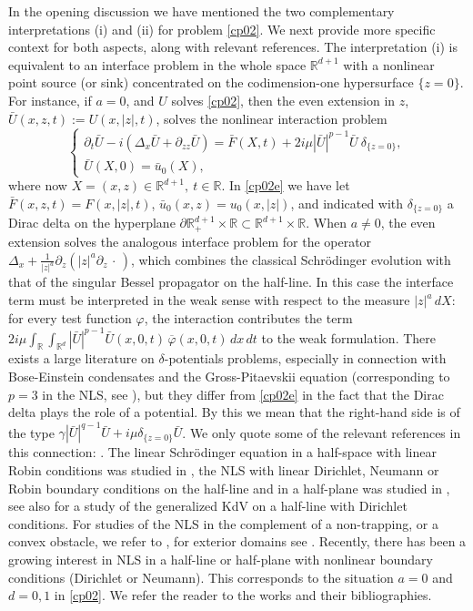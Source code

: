 \documentclass[11pt,letter]{amsart}
\def \RN {\mathbb{R}_+^{d+1}}
\def \R {\mathbb{R}}
\def \vf{\varphi}
\newcommand{\Rd}{\mathbb R^d}
\newcommand{\p}{\partial}
\numberwithin{equation}{section}
\numberwithin{equation}{section}
\begin{document}
In the opening discussion we have mentioned the two complementary interpretations  (i) and (ii) for problem \eqref{cp02}. We next provide more specific context for both aspects, along with relevant references. The interpretation (i) is  equivalent to an interface problem in the whole space $\R^{d+1}$ with a nonlinear point source (or sink) concentrated on the codimension-one hypersurface $\{z = 0\}$. For instance, if $a = 0$, and $U$ solves \eqref{cp02}, then the even extension in $z$, $\bar U(x,z,t) := U(x,|z|,t)$, solves the nonlinear interaction problem 
\begin{equation}\label{cp02e}
\begin{cases}
\p_t \bar U - i(\Delta_x \bar U + \p_{zz} \bar U) = \bar F(X,t) + 2 i \mu |\bar U|^{p-1} \bar U\ \delta_{\{z=0\}},  
\\
\bar U(X,0)=\bar u_0(X), 
\end{cases}
\end{equation}
where now $X = (x,z)\in \R^{d+1},\ t\in \R$. In \eqref{cp02e} we have let $\bar F(x,z,t) = F(x,|z|,t)$, $\bar u_0(x,z) = u_0(x,|z|)$, and indicated with $\delta_{\{z=0\}}$ a Dirac delta on the hyperplane $\p \RN\times \R\subset \R^{d+1}\times \R$. When $a\not= 0$, the even extension solves the analogous interface problem for the operator $\Delta_x + \frac{1}{|z|^a}\p_z(|z|^a\p_z\, \cdot\,)$, which combines the classical Schr\"odinger evolution with that of the singular Bessel propagator on the half-line. In this case the interface term must be interpreted in the weak sense with respect to the measure $|z|^a\,dX$: for every test function $\vf$, the interaction contributes the term $2i\mu\int_{\R}\int_{\Rd}|\bar U|^{p-1}\bar U(x,0,t)\,\overline{\vf}(x,0,t)\,dx\,dt$ to the weak formulation.
There exists a large literature on $\delta$-potentials problems, especially in connection with Bose-Einstein condensates and the Gross-Pitaevskii equation (corresponding to $p=3$ in the NLS, see \cite{PS}), but they differ from \eqref{cp02e} in the fact that the Dirac delta plays the role of a potential. By this we mean that the right-hand side is of the type $\gamma |\bar U|^{q-1} \bar U  + i \mu \delta_{\{z=0\}} \bar U$. We only quote some of the relevant references in this connection: \cite{ABD, ABD2, AT, FTDSK, AGHH, HMZ, FOO, HZ, KS, DP, BV, GMW, CFN, CFN23, GI1, GI2, OST3, MSa, GIS}. 
The linear Schr\"odinger equation in a half-space with linear Robin conditions was studied in \cite{Au}, the NLS with linear Dirichlet, Neumann or Robin boundary  conditions on the half-line and in a half-plane was  studied in \cite{SB, Ho, ET, BSZ, RSZ, HK19, HiM1, HiM2, OST2}, see also \cite{CK} for a study of the generalized KdV on a half-line with Dirichlet conditions. For studies of the NLS in the complement of a non-trapping, or a convex obstacle, we refer to \cite{TsuY, BGT,  An, KVZ, KVZ2, Iv}, for exterior domains see \cite{Tsu}. Recently, there has been a growing interest in NLS in a half-line or half-plane with nonlinear boundary conditions (Dirichlet or Neumann). This corresponds to the situation $a=0$ and $d = 0, 1$ in \eqref{cp02}. We refer the reader to the works \cite{AD, HK19, HKO, HOS} and their bibliographies.
\end{document}
